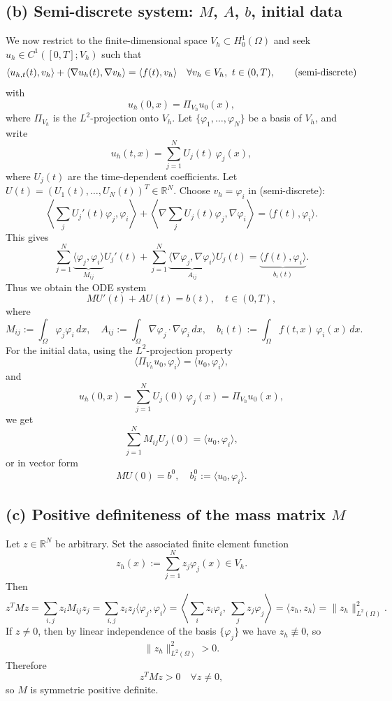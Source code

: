 \subsection*{(b) Semi-discrete system: $M$, $A$, $b$, initial data}
We now restrict to the finite-dimensional space $V_h \subset H_0^1(\Omega)$ and seek
$u_h \in C^1([0,T];V_h)$ such that
\[
    \langle u_{h,t}(t),v_h\rangle + \langle \nabla u_h(t),\nabla v_h\rangle
    = \langle f(t),v_h\rangle \quad \forall v_h\in V_h,\ t\in(0,T), \tag{\text{semi-discrete}}
\]
with
\[
    u_h(0,x) = \Pi_{V_h}u_0(x),
\]
where $\Pi_{V_h}$ is the $L^2$-projection onto $V_h$.
Let $\{\varphi_1,\dots,\varphi_N\}$ be a basis of $V_h$, and write
\[
    u_h(t,x) = \sum_{j=1}^N U_j(t)\,\varphi_j(x),
\]
where $U_j(t)$ are the time-dependent coefficients. Let $U(t) = (U_1(t),\dots,U_N(t))^T\in\mathbb{R}^N$.
Choose $v_h = \varphi_i$ in (semi-discrete):
\[
    \left\langle \sum_{j} U_j'(t)\varphi_j,\varphi_i\right\rangle
    + \left\langle \nabla\sum_j U_j(t)\varphi_j,\nabla\varphi_i\right\rangle
    = \langle f(t),\varphi_i\rangle.
\]
This gives
\[
    \sum_{j=1}^N \underbrace{\langle \varphi_j,\varphi_i\rangle}_{M_{ij}} U_j'(t)
    + \sum_{j=1}^N \underbrace{\langle \nabla\varphi_j,\nabla\varphi_i\rangle}_{A_{ij}} U_j(t)
    = \underbrace{\langle f(t),\varphi_i\rangle}_{b_i(t)}.
\]
Thus we obtain the ODE system
\[
    \boxed{M U'(t) + A U(t) = b(t), \quad t\in(0,T),}
\]
where
\[
    M_{ij} := \int_\Omega \varphi_j\varphi_i\,dx,
    \quad
    A_{ij} := \int_\Omega \nabla\varphi_j\cdot\nabla\varphi_i\,dx,
    \quad
    b_i(t) := \int_\Omega f(t,x)\,\varphi_i(x)\,dx.
\]
For the initial data, using the $L^2$-projection property
\[
    \langle \Pi_{V_h}u_0,\varphi_i\rangle = \langle u_0,\varphi_i\rangle,
\]
and
\[
    u_h(0,x) = \sum_{j=1}^N U_j(0)\,\varphi_j(x) = \Pi_{V_h}u_0(x),
\]
we get
\[
    \sum_{j=1}^N M_{ij} U_j(0) = \langle u_0,\varphi_i\rangle,
\]
or in vector form
\[
    \boxed{M U(0) = b^0,\quad b^0_i := \langle u_0,\varphi_i\rangle.}
\]
\subsection*{(c) Positive definiteness of the mass matrix $M$}
Let $z\in\mathbb{R}^N$ be arbitrary. Set the associated finite element function
\[
    z_h(x) := \sum_{j=1}^N z_j \varphi_j(x) \in V_h.
\]
Then
\[
    z^T M z
    = \sum_{i,j} z_i M_{ij} z_j
    = \sum_{i,j} z_i z_j \langle \varphi_j,\varphi_i\rangle
    = \left\langle \sum_i z_i\varphi_i,\ \sum_j z_j\varphi_j \right\rangle
    = \langle z_h,z_h\rangle
    = \|z_h\|_{L^2(\Omega)}^2.
\]
If $z\neq 0$, then by linear independence of the basis $\{\varphi_j\}$ we have $z_h\not\equiv 0$, so
\[
    \|z_h\|_{L^2(\Omega)}^2 > 0.
\]
Therefore
\[
    z^T M z > 0 \quad \forall z\neq 0,
\]
so $M$ is symmetric positive definite.
